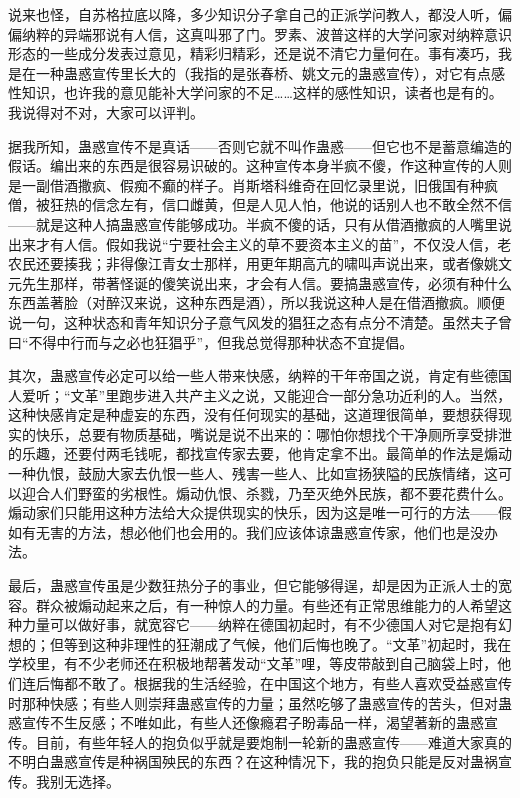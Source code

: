 说来也怪，自苏格拉底以降，多少知识分子拿自己的正派学问教人，都没人听，偏偏纳粹的异端邪说有人信，这真叫邪了门。罗素、波普这样的大学问家对纳粹意识形态的一些成分发表过意见，精彩归精彩，还是说不清它力量何在。事有凑巧，我是在一种蛊惑宣传里长大的（我指的是张春桥、姚文元的蛊惑宣传），对它有点感性知识，也许我的意见能补大学问家的不足……这样的感性知识，读者也是有的。我说得对不对，大家可以评判。 

据我所知，蛊惑宣传不是真话——否则它就不叫作蛊惑——但它也不是蓄意编造的假话。编出来的东西是很容易识破的。这种宣传本身半疯不傻，作这种宣传的人则是一副借酒撒疯、假痴不癫的样子。肖斯塔科维奇在回忆录里说，旧俄国有种疯僧，被狂热的信念左有，信口雌黄，但是人见人怕，他说的话别人也不敢全然不信——就是这种人搞蛊惑宣传能够成功。半疯不傻的话，只有从借酒撤疯的人嘴里说出来才有人信。假如我说“宁要社会主义的草不要资本主义的苗”，不仅没人信，老农民还要揍我；非得像江青女士那样，用更年期高亢的啸叫声说出来，或者像姚文元先生那样，带著怪诞的傻笑说出来，才会有人信。要搞蛊惑宣传，必须有种什么东西盖著脸（对醉汉来说，这种东西是酒），所以我说这种人是在借酒撤疯。顺便说一句，这种状态和青年知识分子意气风发的猖狂之态有点分不清楚。虽然夫子曾曰“不得中行而与之必也狂猖乎”，但我总觉得那种状态不宜提倡。 

其次，蛊惑宣传必定可以给一些人带来快感，纳粹的干年帝国之说，肯定有些德国人爱听；“文革”里跑步进入共产主义之说，又能迎合一部分急功近利的人。当然，这种快感肯定是种虚妄的东西，没有任何现实的基础，这道理很简单，要想获得现实的快乐，总要有物质基础，嘴说是说不出来的：哪怕你想找个干净厕所享受排泄的乐趣，还要付两毛钱呢，都找宣传家去要，他肯定拿不出。最简单的作法是煽动一种仇恨，鼓励大家去仇恨一些人、残害一些人、比如宣扬狭隘的民族情绪，这可以迎合人们野蛮的劣根性。煽动仇恨、杀戮，乃至灭绝外民族，都不要花费什么。煽动家们只能用这种方法给大众提供现实的快乐，因为这是唯一可行的方法——假如有无害的方法，想必他们也会用的。我们应该体谅蛊惑宣传家，他们也是没办法。 

最后，蛊惑宣传虽是少数狂热分子的事业，但它能够得逞，却是因为正派人士的宽容。群众被煽动起来之后，有一种惊人的力量。有些还有正常思维能力的人希望这种力量可以做好事，就宽容它——纳粹在德国初起时，有不少德国人对它是抱有幻想的；但等到这种非理性的狂潮成了气候，他们后悔也晚了。“文革”初起时，我在学校里，有不少老师还在积极地帮著发动“文革”哩，等皮带敲到自己脑袋上时，他们连后悔都不敢了。根据我的生活经验，在中国这个地方，有些人喜欢受益惑宣传时那种快感；有些人则崇拜蛊惑宣传的力量；虽然吃够了蛊惑宣传的苦头，但对蛊惑宣传不生反感；不唯如此，有些人还像瘾君子盼毒品一样，渴望著新的蛊惑宣传。目前，有些年轻人的抱负似乎就是要炮制一轮新的蛊惑宣传——难道大家真的不明白蛊惑宣传是种祸国殃民的东西？在这种情况下，我的抱负只能是反对蛊祸宣传。我别无选择。


